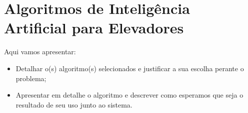 \chapter{\label{chap:ai}Algoritmos de Inteligência Artificial para Elevadores}

Aqui vamos apresentar:

\begin{itemize}
\item Detalhar o(s) algoritmo(s) selecionados e justificar a sua escolha perante o problema;
\item Apresentar em detalhe o algoritmo e descrever como esperamos que seja o resultado de seu uso junto ao sistema.
\end{itemize}
